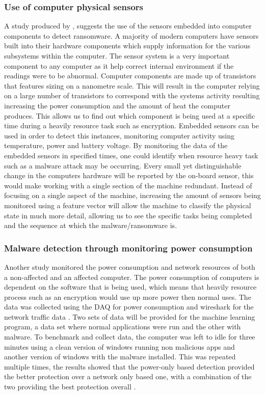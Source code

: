 \documentclass[progress]{cmpreport}
\begin{document}
		\subsubsection{Use of computer physical sensors}
		 	A study produced by \cite{Taylor}, suggests the use of the sensors embedded into computer components to detect ransomware. A majority of modern computers have sensors built into their hardware components which supply information for the various subsystems within the computer. The sensor system is a very important component to any computer as it help correct internal environment if the readings were to be abnormal. Computer components are made up of transistors that features sizing on a nanometre scale. This will result in the computer relying on a large number of transistors to correspond with the systems activity resulting increasing the power consumption and the amount of heat the computer produces. This allows us to find out which component is being used at a specific time during a heavily resource task such as encryption. Embedded sensors can be used in order to detect this instances, monitoring computer activity using temperature, power and battery voltage. By monitoring the data of the embedded sensors in specified times, one could identify when resource heavy task such as a malware attack may be occurring. Every small yet distinguishable change in the computers hardware will be reported by the on-board sensor, this would make working with a single section of the machine redundant. Instead of focusing on a single aspect of the machine, increasing the amount of sensors being monitored using a feature vector will allow the machine to classify the physical state in much more detail, allowing us to see the specific tasks being completed and the sequence at which the malware/ransomware is.
		\subsubsection{Malware detection through monitoring power consumption}	
			Another study monitored the power consumption and network resources of both a non-affected and an affected computer. The power consumption of computers is dependent on the software that is being used, which means that heavily resource process such as an encryption would use up more power then normal uses. The data was collected using the DAQ for power consumption and wireshark for the network traffic data \citep{8855288}. Two sets of data will be provided for the machine learning program, a data set where normal applications were run and the other with malware. To benchmark and collect data, the computer was left to idle for three minutes using a clean version of windows running non malicious apps and another version of windows with the malware installed. This was repeated multiple times, the results showed that the power-only based detection provided the better protection over a network only based one, with a combination of the two providing the best protection overall \citep{8855288}. 
\end{document}
